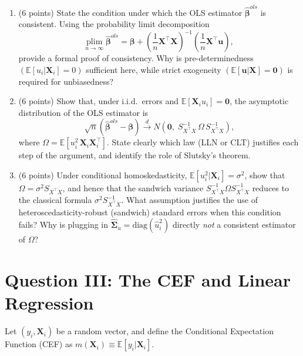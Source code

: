 \documentclass[letterpaper,12pt]{article}
\begin{document}
\begin{enumerate}[label=(\alph*)]

\item (6 points) State the condition under which the OLS estimator $\hat{\boldsymbol{\beta}}^{ols}$ is consistent. Using the probability limit decomposition
\[
\underset{n\to\infty}{\mathrm{plim}}\;\hat{\boldsymbol{\beta}}^{ols}
= \boldsymbol{\beta}
+ \left(\frac{1}{n}\mathbf{X}^\top\mathbf{X}\right)^{-1}
  \left(\frac{1}{n}\mathbf{X}^\top\mathbf{u}\right),
\]
provide a formal proof of consistency. Why is pre-determinedness $\left(\mathbb{E}[u_i|\mathbf{X}_i]=0\right)$ sufficient here, while strict exogeneity $\left(\mathbb{E}[\mathbf{u}|\mathbf{X}]=\mathbf{0}\right)$ is required for unbiasedness?

\item (6 points) Show that, under i.i.d.\ errors and $\mathbb{E}[\mathbf{X}_i u_i]=\mathbf{0}$, the asymptotic distribution of the OLS estimator is
\[
\sqrt{n}\left(\hat{\boldsymbol{\beta}}^{ols}-\boldsymbol{\beta}\right)
\xrightarrow{d}
N\!\left(\mathbf{0},\; S_{X^\top X}^{-1}\,\Omega\, S_{X^\top X}^{-1}\right),
\]
where $\Omega = \mathbb{E}[u_i^2\, \mathbf{X}_i\mathbf{X}_i^\top]$. State clearly which law (LLN or CLT) justifies each step of the argument, and identify the role of Slutsky's theorem.

\item (6 points) Under conditional homoskedasticity, $\mathbb{E}[u_i^2|\mathbf{X}_i]=\sigma^2$, show that $\Omega = \sigma^2 S_{X^\top X}$, and hence that the sandwich variance $S_{X^\top X}^{-1}\Omega S_{X^\top X}^{-1}$ reduces to the classical formula $\sigma^2 S_{X^\top X}^{-1}$. What assumption justifies the use of heteroscedasticity-robust (sandwich) standard errors when this condition fails? Why is plugging in $\hat{\bm{\Sigma}}_u = \mathrm{diag}(\hat{u}_i^2)$ directly \textit{not} a consistent estimator of $\Omega$?

\end{enumerate}

\section*{Question III: The CEF and Linear Regression}

Let $(y_i, \mathbf{X}_i)$ be a random vector, and define the Conditional Expectation Function (CEF) as $m(\mathbf{X}_i)\equiv\mathbb{E}[y_i|\mathbf{X}_i]$.
\end{document}
